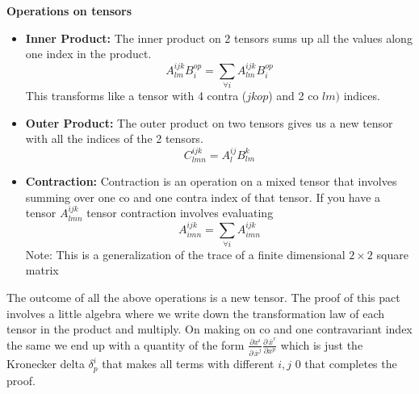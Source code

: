 \documentclass{article}
\newcommand{\note}[1]{\color{blue} Note: #1 \color{black}}
\newcommand{\olsi}[1]{\,\overline{\!{#1}}} %
\begin{document}
\textbf{Operations on tensors}
\begin{itemize} 
    \item \textbf{Inner Product:} The inner product on 2 tensors sums up all the values along one index in the product. 
    \begin{equation*}
        A_{lm}^{ijk} B _{i}^{op} = \sum_{\forall i}  A_{lm}^{ijk} B _{i}^{op}
    \end{equation*}
    This transforms like a tensor with 4 contra (\(jkop\)) and 2 co \(lm)\) indices. 
    \item \textbf{Outer Product:} The outer product on two tensors gives us a new tensor with all the indices of the 2 tensors. 
    \begin{equation*}
        C_{lmn}^{ijk} = A_{l}^{ij} B_{lm}^{k}
    \end{equation*}
    \item \textbf{Contraction:} Contraction is an operation on a mixed tensor that involves summing over one co and one contra index of that tensor. If you have a tensor $A_{lmn}^{ijk}$ tensor contraction involves evaluating 
    \begin{equation*}
        A_{imn}^{ijk} = \sum_{\forall i} A_{imn}^{ijk}
    \end{equation*} 
    \note{This is a generalization of the trace of a finite dimensional $2\times 2$ square matrix}
\end{itemize}
The outcome of all the above operations is a new tensor. The proof of this pact involves a little algebra where we write down the transformation law of each tensor in the product and multiply. On making on co and one contravariant index the same we end up with a quantity of the form \( \frac{\partial x^i}{\partial\olsi{x}^j} \frac{\partial \olsi{x}^r}{\partial x^p} \) which is just the Kronecker delta \(\delta_p^i \) that makes all terms with different \(i,j\) 0 that completes the proof. \\
\end{document}
